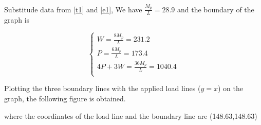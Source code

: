 Substitude data from \autoref{t1} and \autoref{e1}, We have $\frac{M_p}{L}=28.9$ and the boundary of the graph is 

$$
\left\{ \begin{array}{l}
	W=\frac{8M_p}{L}=231.2\\
	P=\frac{6M_p}{L}=173.4\\
	4P+3W=\frac{36M_p}{L}=1040.4\\
\end{array} \right. 
$$

Plotting the three boundary lines with the applied load lines ($y=x$) on the graph, the following figure is obtained.

where the coordinates of the load line and the boundary line are (148.63,148.63)







